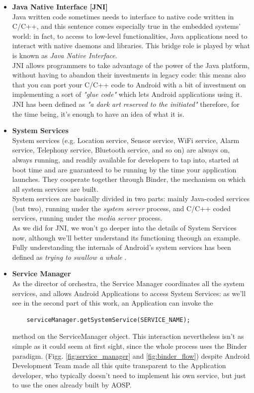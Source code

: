 \begin{itemize}
\item \textbf{Java Native Interface [JNI]}\\
Java written code sometimes needs to interface to native code written in C/C++, and this sentence comes especially true in the embedded systems' world: in fact, to access to low-level functionalities, Java applications need to interact with native daemons and libraries. This bridge role is played by what is known as \textit{Java Native Interface}.\\
JNI allows programmers to take advantage of the power of the Java platform, without having to abandon their investments in legacy code: this means also that you can port your C/C++ code to Android with a bit of investment on implementing a sort of \textit{"glue code"} which lets Android applications using it. JNI has been defined as \textit{"a dark art reserved to the initiated"} \cite{embandroid} therefore, for the time being, it's enough to have an idea of what it is.
\item \textbf{System Services}\\
System services (e.g. Location service, Sensor service, WiFi service, Alarm service, Telephony service, Bluetooth service, and so on) are always on, always running, and readily available for developers to tap into, started at boot time and are guaranteed to be running by the time your application launches. They cooperate together through Binder, the mechanism on which all system services are built.\\
System services are basically divided in two parts: mainly Java-coded services (but two), running under the \textit{system server} process, and C/C++ coded services, running under the \textit{media server} process.\\
As we did for JNI, we won't go deeper into the details of System Services now, although we'll better understand its functioning theough an example. Fully understanding the internals of Android's system services has been defined as \textit{trying to swallow a whale} \cite{embandroid}.
\item \textbf{Service Manager}\\
As the director of orchestra, the Service Manager coordinates all the system services, and allows Android Applications to access System Services: as we'll see in the second part of this work, an Application can invoke the
\begin{verbatim}
	serviceManager.getSystemService(SERVICE_NAME);
\end{verbatim} method on the ServiceManager object. This interaction nevertheless isn't as simple as it could seem at first sight, since the whole process uses the Binder paradigm. (Figg. \ref{fig:service_manager} and \ref{fig:binder_flow}) despite Android Development Team made all this quite transparent to the Application developer, who typically doesn't need to implement his own service, but just to use the ones already built by AOSP.

\end{itemize}

